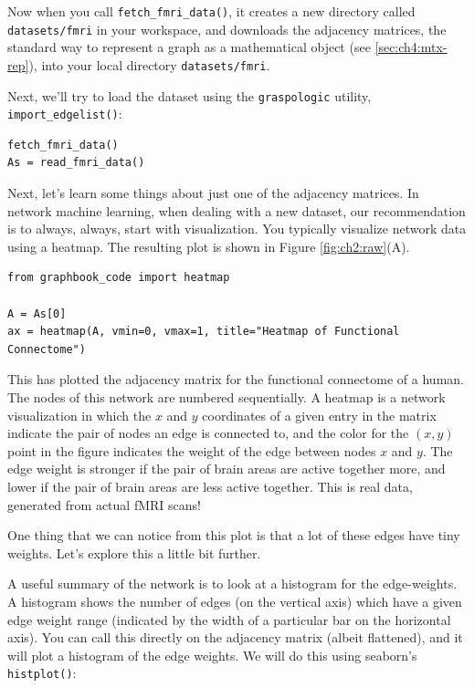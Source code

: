 Now when you call \texttt{fetch\_fmri\_data()}, it creates a new directory called \texttt{datasets/fmri} in your workspace, and downloads the adjacency matrices, the standard way to represent a graph as a mathematical object (see \ref{sec:ch4:mtx-rep}), into your local directory \texttt{datasets/fmri}.

Next, we'll try to load the dataset using the \texttt{graspologic} utility, \texttt{import\_edgelist()}:

\begin{lstlisting}[style=python]
fetch_fmri_data()
As = read_fmri_data()
\end{lstlisting}

Next, let's learn some things about just one of the adjacency matrices. In network machine learning, when dealing with a new dataset, our recommendation is to {always}, {always}, start with visualization. You typically visualize network data using a heatmap. The resulting plot is shown in Figure \ref{fig:ch2:raw}(A).

\begin{lstlisting}[style=python]
from graphbook_code import heatmap

A = As[0]
ax = heatmap(A, vmin=0, vmax=1, title="Heatmap of Functional Connectome")
\end{lstlisting}

This has plotted the adjacency matrix for the functional connectome of a human. The nodes of this network are numbered sequentially. A heatmap is a network visualization in which the $x$ and $y$ coordinates of a given entry in the matrix indicate the pair of nodes an edge is connected to, and the color for the $(x,y)$ point in the figure indicates the weight of the edge between nodes $x$ and $y$. The edge weight is stronger if the pair of brain areas are active together more, and lower if the pair of brain areas are less active together. This is real data, generated from actual fMRI scans!

One thing that we can notice from this plot is that a lot of these edges have tiny weights. Let's explore this a little bit further. 

A useful summary of the network is to look at a histogram for the edge-weights. A histogram shows the number of edges (on the vertical axis) which have a given edge weight range (indicated by the width of a particular bar on the horizontal axis). You can call this directly on the adjacency matrix (albeit flattened), and it will plot a histogram of the edge weights. We will do this using seaborn's \texttt{histplot()}:

